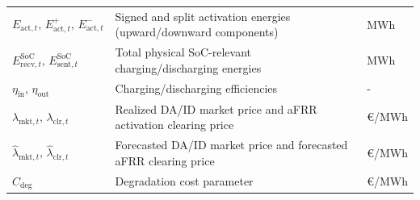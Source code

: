 \begin{longtable}{@{}>{\raggedright\arraybackslash}p{} >{\raggedright\arraybackslash}p{} >{\raggedright\arraybackslash}p{}@{}}
    $E_{\text{act},t},\,E_{\text{act},t}^{+},\,E_{\text{act},t}^{-}$                                                                                                                                                                                                                                          & Signed and split activation energies (upward/downward components)                                                                  & MWh                                 \\
    $E_{\text{recv},t}^{\text{SoC}},\,E_{\text{sent},t}^{\text{SoC}}$                                                                                                                                                                                                                                         & Total physical SoC-relevant charging/discharging energies                                                                          & MWh                                 \\
    $\eta_{\text{in}},\,\eta_{\text{out}}$                                                                                                                                                                                                                                                                    & Charging/discharging efficiencies                                                                                                  & -                                   \\
    $\lambda_{\text{mkt},t},\,\lambda_{\text{clr},t}$                                                                                                                                                                                                                                                         & Realized DA/ID market price and aFRR activation clearing price                                                                     & €/MWh                               \\
    $\hat{\lambda}_{\text{mkt},t},\,\hat{\lambda}_{\text{clr},t}$                                                                                                                                                                                                                                             & Forecasted DA/ID market price and forecasted aFRR clearing price                                                                   & €/MWh                               \\
    $C_{\text{deg}}$                                                                                                                                                                                                                                                                                          & Degradation cost parameter                                                                                                         & €/MWh                               \\

\end{longtable}

